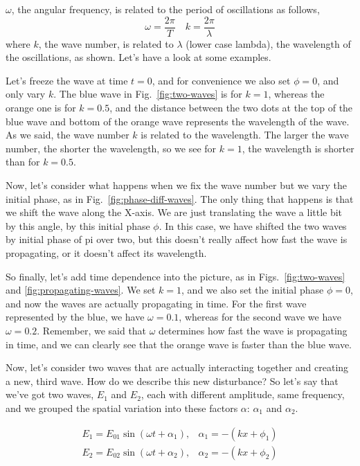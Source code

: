 $\omega$, the angular frequency, is related to the period of oscillations as follows,
\begin{equation}
\omega=\frac{2 \pi}{T} \quad k=\frac{2 \pi}{\lambda}
\end{equation}
where $k$, the wave number, is related to $\lambda$ (lower case lambda), the wavelength of the oscillations, as shown. Let's have a look at some examples.

Let's freeze the wave at time $t=0$, and for convenience we also set $\phi = 0$, and only vary $k$. The blue wave in Fig.~\ref{fig:two-waves} is for $k=1$, whereas the orange one is for $k=0.5$, and the distance between the two dots at the top of the blue wave and bottom of the orange wave represents the wavelength of the wave. As we said, the wave number $k$ is related to the wavelength. The larger the wave number, the shorter the wavelength, so we see for $k=1$, the wavelength is shorter than for $k=0.5$.

Now, let's consider what happens when we fix the wave number but we vary the initial phase, as in Fig.~\ref{fig:phase-diff-waves}. The only thing that happens is that we shift the wave along the X-axis. We are just translating the wave a little bit by this angle, by this initial phase $\phi$. In this case, we have shifted the two waves by initial phase of pi over two, but this doesn't really affect how fast the wave is propagating, or it doesn't affect its wavelength.

So finally, let's add time dependence into the picture, as in Figs.~\ref{fig:two-waves} and \ref{fig:propagating-waves}. We set $k=1$, and we also set the initial phase $\phi=0$, and now the waves are actually propagating in time. For the first wave represented by the blue, we have $\omega=0.1$, whereas for the second wave we have $\omega=0.2$. Remember, we said that $\omega$ determines how fast the wave is propagating in time, and we can clearly see that the orange wave is faster than the blue wave.

Now, let's consider two waves that are actually interacting together and creating a new, third wave. How do we describe this new disturbance? So let's say that we've got two waves, $E_1$ and $E_2$, each with different amplitude, same frequency, and we grouped the spatial variation into these factors $\alpha$: $\alpha_1$ and $\alpha_2$.

\begin{equation}
\begin{array}{ll}
E_1=E_{01} \sin \left(\omega t+\alpha_1\right), & \alpha_1=-\left(k x+\phi_1\right) \\
E_2=E_{02} \sin \left(\omega t+\alpha_2\right), & \alpha_2=-\left(k x+\phi_2\right)
\end{array}
\label{eq:superposition}
\end{equation}

